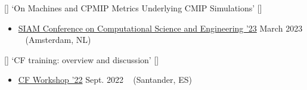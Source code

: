 \begin{talks}
    \talk
	{\faCommentingO \hspace{1mm} [\faEnvelopeO] \hspace{1mm} `On Machines and CPMIP Metrics Underlying CMIP Simulations' [\href{https://github.com/sadielbartholomew/sadielbartholomew/blob/master/talks-and-workshops/siam-cse-23-es-doc-cmip-platform/siam-cse-23-es-doc-cmip-platform.pdf}{\small{\linkSymbol}}]}
	{
	\begin{itemize}[leftmargin=.4in]
	    \item \href{https://www.siam.org/conferences-events/past-event-archive/cse23/}{SIAM Conference on Computational Science and Engineering '23}
	    \hfill March 2023 ~ (Amsterdam, NL)
	\end{itemize}
	}

    \talk
	{\faCommentingO \hspace{1mm} [\faEnvelopeO] \hspace{1mm} `CF training: overview and discussion' [\href{https://github.com/sadielbartholomew/sadielbartholomew/blob/master/talks-and-workshops/cf-workshop-22-RE-training.pdf}{\small{\linkSymbol}}]}
	{
	\begin{itemize}[leftmargin=.4in]
	    \item \href{https://cfconventions.org/Meetings/2022-Workshop.html}{CF Workshop '22}
	    \hfill Sept. 2022 ~ (Santander, ES)
	\end{itemize}
	}

\end{talks}
